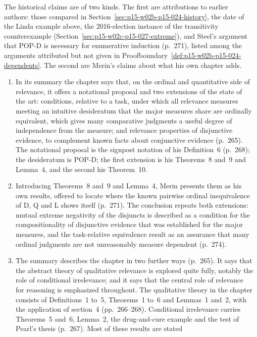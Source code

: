 The historical claims are of two kinds. The first are attributions to
earlier authors: those compared in
Section~\ref{sec:p15-w02b-p15-024-history}, the date of the Linda example
above, the 2016-election instance of the transitivity counterexample
(Section~\ref{sec:p15-w02c-p15-027-extreme}), and Steel's argument that
POP-D is necessary for enumerative induction (p.~271), listed among the
arguments attributed but not given in
Proofboundary~\ref{def:p15-w02b-p15-024-dependents}. The second are
Merin's claims about what his own chapter adds.
\begin{enumerate}
\item In its summary the chapter says that, on the ordinal and
  quantitative side of relevance, it offers a notational proposal and
  two extensions of the state of the art: conditions, relative to a
  task, under which all relevance measures meeting an intuitive
  desideratum that the major measures share are ordinally equivalent, which gives many comparative
  judgments a useful degree of independence from the measure; and
  relevance properties of disjunctive evidence, to complement known facts
  about conjunctive evidence (p.~265). The notational proposal is the
  signpost notation of his Definition~6 (p.~268); the desideratum is
  POP-D; the first extension is his Theorems~8 and~9 and Lemma~4, and the
  second his Theorem~10.
\item Introducing Theorems~8 and~9 and Lemma~4, Merin presents them as
  his own results, offered to locate where the known pairwise ordinal
  inequivalence of D, Q and L shows itself (p.~271). The conclusion
  repeats both extensions: mutual extreme negativity of the disjuncts is
  described as a condition for the compositionality of disjunctive
  evidence that was established for the major measures, and the
  task-relative equivalence result as an assurance that many ordinal
  judgments are not unreasonably measure dependent (p.~274).
\item The summary describes the chapter in two further ways (p.~265). It
  says that the abstract theory of qualitative relevance is explored
  quite fully, notably the role of conditional irrelevance; and it says
  that the central role of relevance for reasoning is emphasized
  throughout. The qualitative theory in the chapter consists of
  Definitions~1 to~5, Theorems~1 to~6 and Lemmas~1 and~2, with the
  application of section~4 (pp.~266--268). Conditional irrelevance
  carries Theorems~5 and~6, Lemma~2, the drug-and-cure example and the
  test of Pearl's thesis (p.~267). Most of these results are stated

\end{enumerate}
